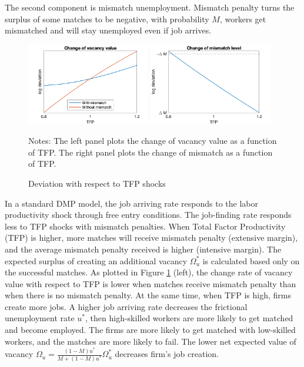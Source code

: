 \documentclass[12pt]{article}
\newcommand{\1}{\mathbb{1}}
\begin{document}
The second component is mismatch unemployment. Mismatch penalty turns the surplus of some matches to be negative, with probability $M$, workers get mismatched and will stay unemployed even if job arrives.  

\begin{figure}[h!]
\begin{center}
\includegraphics[width=0.48\textwidth]{Analytical3}
\includegraphics[width=0.48\textwidth]{Analytical4}
\end{center}
\caption{Deviation with respect to TFP shocks}
\label{Analytical3}
{\scriptsize Notes: The left panel plots the change of vacancy value as a function of  TFP. The right panel plots the change of mismatch as a function of TFP.} 
\end{figure}

In a standard DMP model, the job arriving rate responds to the labor productivity shock through free entry conditions. The job-finding rate responds less to TFP shocks with mismatch penalties. When Total Factor Productivity (TFP) is higher, more matches will receive mismatch penalty (extensive margin), and the average mismatch penalty received is higher (intensive margin).  The expected surplus of creating an additional vacancy $\Omega_u^*$ is calculated based only on the successful matches. As plotted in Figure \ref{Analytical3} (left), the change rate of vacancy value with respect to TFP is lower when matches receive mismatch penalty than when there is no mismatch penalty. At the same time, when TFP is high, firms create more jobs. A higher job arriving rate decreases the frictional unemployment rate $u^*$, then high-skilled workers are more likely to get matched and become employed. The firms are more likely to get matched with low-skilled workers, and the matches are more likely to fail. The lower net expected value of vacancy $\Omega_u = \frac{(1-M)u^*}{M + (1-M)u^*}\Omega_u^*$ decreases firm's job creation.
\end{document}

